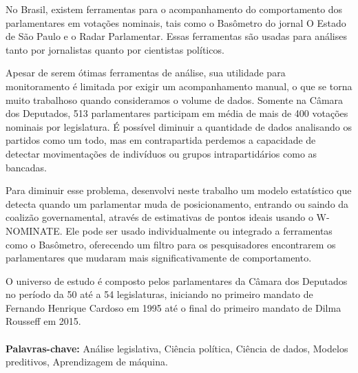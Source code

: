 No Brasil, existem ferramentas para o acompanhamento do comportamento dos
parlamentares em votações nominais, tais como o Basômetro do jornal O Estado de
São Paulo e o Radar Parlamentar. Essas ferramentas são usadas para análises
tanto por jornalistas quanto por cientistas políticos.

Apesar de serem ótimas ferramentas de análise, sua utilidade para monitoramento
é limitada por exigir um acompanhamento manual, o que se torna muito trabalhoso
quando consideramos o volume de dados. Somente na Câmara dos Deputados, 513
parlamentares participam em média de mais de 400 votações nominais por
legislatura. É possível diminuir a quantidade de dados analisando os partidos
como um todo, mas em contrapartida perdemos a capacidade de detectar
movimentações de indivíduos ou grupos intrapartidários como as bancadas.


Para diminuir esse problema, desenvolvi neste trabalho um modelo estatístico
que detecta quando um parlamentar muda de posicionamento, entrando ou saindo da
coalizão governamental, através de estimativas de pontos ideais usando o
W-NOMINATE. Ele pode ser usado individualmente ou integrado a ferramentas como
o Basômetro, oferecendo um filtro para os pesquisadores encontrarem os
parlamentares que mudaram mais significativamente de comportamento.

O universo de estudo é composto pelos parlamentares da Câmara dos Deputados no
período da 50\textordfeminine{} até a 54\textordfeminine{} legislaturas,
iniciando no primeiro mandato de Fernando Henrique Cardoso em 1995 até o final
do primeiro mandato de Dilma Rousseff em 2015.
\\
\\
\textbf{Palavras-chave:} Análise legislativa, Ciência política, Ciência de
dados, Modelos preditivos, Aprendizagem de máquina.


